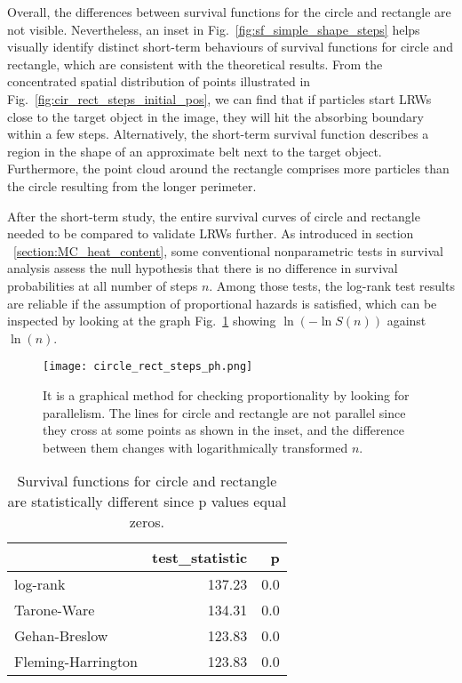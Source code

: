 Overall, the differences between survival functions for the circle and
rectangle are not visible. Nevertheless, an inset in
Fig.~\ref{fig:sf_simple_shape_steps} helps visually identify distinct
short-term behaviours of survival functions for circle and rectangle,
which are consistent with the theoretical results. From the
concentrated spatial distribution of points illustrated in
Fig.~\ref{fig:cir_rect_steps_initial_pos}, we can find that if
particles start LRWs close to the target object in the image, they
will hit the absorbing boundary within a few steps. Alternatively, the
short-term survival function describes a region in the shape of an
approximate belt next to the target object. Furthermore, the point
cloud around the rectangle comprises more particles than the circle
resulting from the longer perimeter. 



After the short-term study, the entire survival curves of circle and
rectangle needed to be compared to validate LRWs further. As
introduced in section ~\ref{section:MC_heat_content}, some
conventional nonparametric tests in survival analysis assess the null
hypothesis that there is no difference in survival probabilities at
all number of steps $n$. Among those tests, the log-rank test results
are reliable if the assumption of proportional hazards is satisfied,
which can be inspected by looking at the graph
Fig.~\ref{fig:ph_test_simple_shapes} showing $\ln{(-\ln{S(n)})}$
against $\ln{(n)}$.


   \begin{figure}
     \centering
     \texttt{[image: circle\_rect\_steps\_ph.png]}
     \caption{It is a graphical method for checking proportionality by looking for parallelism. The lines for circle and rectangle are not parallel since they cross at some points as shown in the inset, and the difference between them changes with logarithmically transformed $n$.}
     \label{fig:ph_test_simple_shapes}
   \end{figure}


  \begin{table}
     \centering
     \begin{tabular}{lrr}
        \toprule
         {} &  test\_statistic &             p \\
         \midrule
         log-rank & 137.23 & 0.0 \\
         \midrule
         Tarone-Ware & 134.31 & 0.0 \\
         \midrule
         Gehan-Breslow & 123.83 & 0.0 \\
         \midrule
         Fleming-Harrington & 123.83 & 0.0 \\
         \bottomrule
     \end{tabular}
     \caption{Survival functions for circle and rectangle are statistically different since p values equal zeros.}
     \label{tab:test_simple_shape_steps}
   \end{table}



